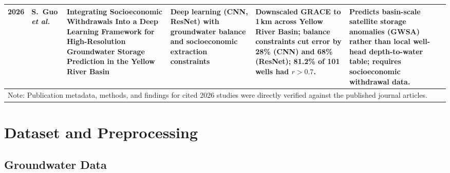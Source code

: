 \documentclass[conference]{IEEEtran}
\begin{document}
\begin{table}[t]
\begin{tabular}{p{0.6cm} p{1.9cm} p{3.6cm} p{2.7cm} p{3.7cm} p{3.9cm}}
\midrule
2026 & S.~Guo \emph{et al.} \cite{guo2026} & Integrating Socioeconomic Withdrawals Into a Deep Learning Framework for High-Resolution Groundwater Storage Prediction in the Yellow River Basin & Deep learning (CNN, ResNet) with groundwater balance and socioeconomic extraction constraints & Downscaled GRACE to 1\,km across Yellow River Basin; balance constraints cut error by 28\% (CNN) and 68\% (ResNet); 81.2\% of 101 wells had $r > 0.7$. & Predicts basin-scale satellite storage anomalies (GWSA) rather than local well-head depth-to-water table; requires socioeconomic withdrawal data. \\
\bottomrule
\multicolumn{6}{p{16.4cm}}{\footnotesize Note: Publication metadata, methods, and findings for cited 2026 studies were directly verified against the published journal articles.}
\end{tabular}
\end{table}

\section{Dataset and Preprocessing}
\label{sec:data}

\subsection{Groundwater Data}
\end{document}
